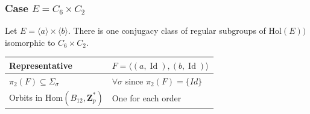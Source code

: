\documentclass[12pt]{article}
\theoremstyle{definition}
\newcommand{\Z}{\mathbf Z}
\newcommand{\Hol}{\mathrm{Hol}}
\newcommand{\Hom}{\mathrm{Hom}}
\newcommand{\Id}{\operatorname{Id}}
\begin{document}
\subsubsection*{Case $E=C_{6}\times C_2$}

Let $E=\langle a\rangle \times \langle b\rangle$. There is  one conjugacy class of regular subgroups of $\Hol(E))$ isomorphic to $C_6\times C_2$.

\begin{center}
    \begin{tabular}{|l|l|}
    \hline
      Representative& $F=\langle (a,\Id), (b,\Id)\rangle$ \\
      \hline
      $\pi_2(F)\subseteq \Sigma_{\sigma}$ &  $\forall\sigma$ since $\pi_2(F)=\{Id\}$ \\
       Orbits in $\Hom(B_{12},\Z_p^*)$ &  One for each order\\
      \hline
    \end{tabular}
\end{center}   
\end{document}
